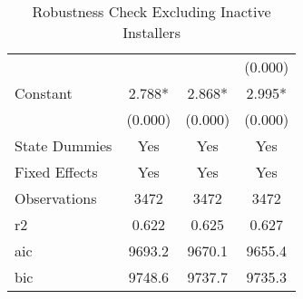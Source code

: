 \begin{table}[]
\begin{tabular}{@{}lccc@{}}
                                   &            &            & (0.000)    \\
Constant                           & 2.788*     & 2.868*     & 2.995*     \\
                                   & (0.000)    & (0.000)    & (0.000)    \\
State Dummies  & Yes        & Yes        & Yes        \\
Fixed Effects  & Yes        & Yes        & Yes        \\                                   
Observations                       & 3472       & 3472       & 3472       \\
r2                                 & 0.622      & 0.625      & 0.627      \\
aic                                & 9693.2     & 9670.1     & 9655.4     \\
bic                                & 9748.6     & 9737.7     & 9735.3     \\ \bottomrule
\end{tabular}
\caption{Robustness Check Excluding Inactive Installers}
\label{rob_exclude_inactive}
\end{table}